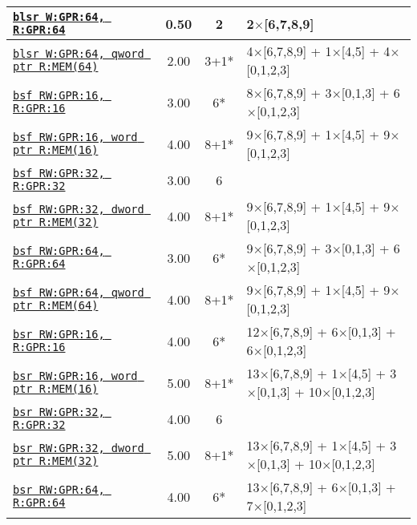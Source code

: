 \documentclass[a4paper,english,fontsize=9]{scrartcl}
\begin{document}
\begin{longtable}{p{}ccL{.25\textwidth}}
  \midrule
  \texttt{\href{https://felixcloutier.com/x86/BLSR.html}{blsr W:GPR:64, R:GPR:64}} & 0.50 & 2 & 2\(\times\)[6,7,8,9] \\
  \midrule
  \texttt{\href{https://felixcloutier.com/x86/BLSR.html}{blsr W:GPR:64, qword ptr R:MEM(64)}} & 2.00 & 3+1* & 4\(\times\)[6,7,8,9] + 1\(\times\)[4,5] + 4\(\times\)[0,1,2,3] \\
  \midrule
  \texttt{\href{https://felixcloutier.com/x86/BSF.html}{bsf RW:GPR:16, R:GPR:16}} & 3.00 & 6* & 8\(\times\)[6,7,8,9] + 3\(\times\)[0,1,3] + 6\(\times\)[0,1,2,3] \\
  \midrule
  \texttt{\href{https://felixcloutier.com/x86/BSF.html}{bsf RW:GPR:16, word ptr R:MEM(16)}} & 4.00 & 8+1* & 9\(\times\)[6,7,8,9] + 1\(\times\)[4,5] + 9\(\times\)[0,1,2,3] \\
  \midrule
  \texttt{\href{https://felixcloutier.com/x86/BSF.html}{bsf RW:GPR:32, R:GPR:32}} & 3.00 & 6 &  \\
  \midrule
  \texttt{\href{https://felixcloutier.com/x86/BSF.html}{bsf RW:GPR:32, dword ptr R:MEM(32)}} & 4.00 & 8+1* & 9\(\times\)[6,7,8,9] + 1\(\times\)[4,5] + 9\(\times\)[0,1,2,3] \\
  \midrule
  \texttt{\href{https://felixcloutier.com/x86/BSF.html}{bsf RW:GPR:64, R:GPR:64}} & 3.00 & 6* & 9\(\times\)[6,7,8,9] + 3\(\times\)[0,1,3] + 6\(\times\)[0,1,2,3] \\
  \midrule
  \texttt{\href{https://felixcloutier.com/x86/BSF.html}{bsf RW:GPR:64, qword ptr R:MEM(64)}} & 4.00 & 8+1* & 9\(\times\)[6,7,8,9] + 1\(\times\)[4,5] + 9\(\times\)[0,1,2,3] \\
  \midrule
  \texttt{\href{https://felixcloutier.com/x86/BSR.html}{bsr RW:GPR:16, R:GPR:16}} & 4.00 & 6* & 12\(\times\)[6,7,8,9] + 6\(\times\)[0,1,3] + 6\(\times\)[0,1,2,3] \\
  \midrule
  \texttt{\href{https://felixcloutier.com/x86/BSR.html}{bsr RW:GPR:16, word ptr R:MEM(16)}} & 5.00 & 8+1* & 13\(\times\)[6,7,8,9] + 1\(\times\)[4,5] + 3\(\times\)[0,1,3] + 10\(\times\)[0,1,2,3] \\
  \midrule
  \texttt{\href{https://felixcloutier.com/x86/BSR.html}{bsr RW:GPR:32, R:GPR:32}} & 4.00 & 6 &  \\
  \midrule
  \texttt{\href{https://felixcloutier.com/x86/BSR.html}{bsr RW:GPR:32, dword ptr R:MEM(32)}} & 5.00 & 8+1* & 13\(\times\)[6,7,8,9] + 1\(\times\)[4,5] + 3\(\times\)[0,1,3] + 10\(\times\)[0,1,2,3] \\
  \midrule
  \texttt{\href{https://felixcloutier.com/x86/BSR.html}{bsr RW:GPR:64, R:GPR:64}} & 4.00 & 6* & 13\(\times\)[6,7,8,9] + 6\(\times\)[0,1,3] + 7\(\times\)[0,1,2,3] \\

\end{longtable}
\end{document}
